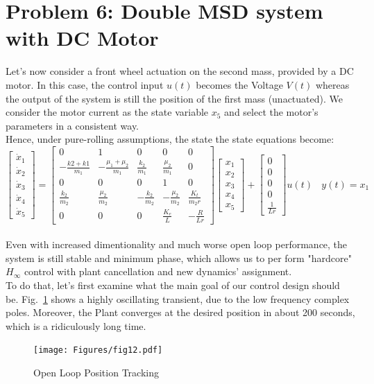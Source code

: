 \documentclass[a4paper, 12pt]{article}
\begin{document}
\section{Problem 6: Double MSD system with DC Motor}
Let's now consider a front wheel actuation on the second mass, provided by a DC motor. In this case, the control input $u(t)$ becomes the Voltage $V(t)$ whereas the output of the system is still the position of the first mass (unactuated). We consider the motor current as the state variable $x_5$ and select the motor's parameters in a consistent way.\\   
Hence, under pure-rolling assumptions, the state the state equations become:
\begin{equation}
    \begin{bmatrix}
    \dot{x}_1 \\
    \dot{x}_2 \\
    \dot{x}_3 \\
    \dot{x}_4\\
    \dot{x}_5
    \end{bmatrix} =
    \begin{bmatrix}
    0 & 1 & 0 & 0 & 0\\
    -\frac{k2+k1}{m_1} & -\frac{\mu_1+\mu_2}{m_1} &
    \frac{k_2}{m_1} & \frac{\mu_2}{m_1} & 0\\
     0 & 0 & 0 & 1 & 0\\
    \frac{k_2}{m_2} & \frac{\mu_2}{m_2} &
    -\frac{k_2}{m_2} & -\frac{\mu_2}{m_2} & 
    \frac{K_t}{m_2r}\\
     0 & 0 & 0 & \frac{K_e}{L} &-\frac{R}{Lr}
    \end{bmatrix}
    \begin{bmatrix}
    x_1 \\
    x_2 \\
    x_3 \\
    x_4 \\
    x_5
    \end{bmatrix} +
    \begin{bmatrix}
    0\\
    0\\
    0\\
    0\\
    \frac{1}{Lr}
    \end{bmatrix}
    u(t)\ \ \ \ 
    y(t) = x_1
\end{equation}
\\Even with increased dimentionality and much worse open loop performance, the system is still stable and minimum phase, which allows us to per form "hardcore" $H_\infty$ control with plant cancellation and new dynamics' assignment.
\\ To do that, let's first examine what the main goal of our control design should be. Fig.~\ref{fig:fig12} shows a highly oscillating transient, due to the low frequency complex poles. Moreover, the Plant converges at the desired position in about 200 seconds, which is a ridiculously long time.
\begin{figure}[h!]
    \centering
    \texttt{[image: Figures/fig12.pdf]}
        \caption{Open Loop Position Tracking}
    \label{fig:fig12}
\end{figure}
\end{document}
